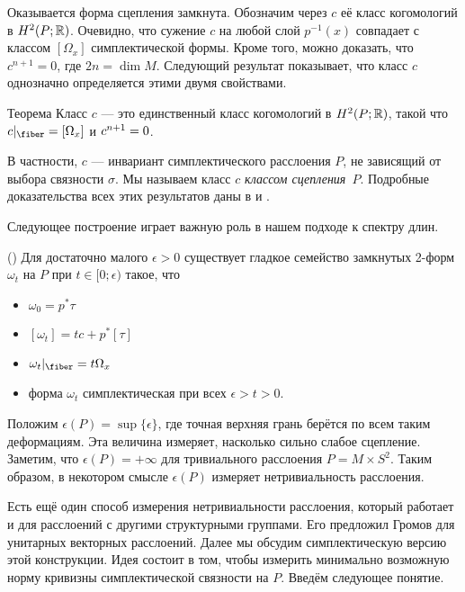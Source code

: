 Оказывается форма сцепления замкнута.
Обозначим через $c$ её класс когомологий в $H^2 (P;\mathbb{R})$.
Очевидно, что сужение $c$ на любой слой $p^{-1}(x)$ совпадает с классом $[\Omega_x]$
симплектической формы.  
Кроме того, можно доказать, что $c^{n+1} = 0$, где $2n = \dim M$.
Следующий результат показывает, что класс $c$ однозначно определяется
этими двумя свойствами. 

\begin{thm}{Теорема}\label{9.3.A}
  Класс $c$ — это единственный класс когомологий в $H^2 (P;\mathbb{R})$,
  такой что $c|_{\fiber} = [\Omega_x]$ и $c^{n+1} \z= 0$.
\end{thm}

В частности, $c$ — инвариант симплектического расслоения $P$, не
зависящий от выбора связности $\sigma$. 
Мы называем класс $c$ \emph{классом сцепления}~$P$.
Подробные доказательства всех этих результатов даны в \cite{GLS} и \cite{MS}.

Следующее построение играет важную роль в нашем подходе к спектру длин.

(\cite{GLS,MS})
Для достаточно малого $\epsilon > 0$ существует гладкое семейство
замкнутых 2-форм $\omega_t$ на $P$ при $t \in [0;\epsilon)$ такое, что 
\begin{itemize}
\item $\omega_0 = p^\ast \tau$
\item $[\omega_t] = tc + p^\ast [\tau]$
\item $\omega_t|_{\fiber} = t\Omega_x$
\item форма $\omega_t$ симплектическая при всех $\epsilon > t > 0$.
\end{itemize}

Положим $\epsilon(P) = \sup \{\epsilon\}$,
где точная верхняя грань берётся по всем таким деформациям.  
Эта величина измеряет, насколько сильно слабое сцепление.
Заметим, что $\epsilon(P) = +\infty$ для тривиального расслоения $P = M \times S^2$.
Таким образом, в некотором смысле $\epsilon(P)$ измеряет нетривиальность расслоения.

Есть ещё один способ измерения нетривиальности расслоения, который
работает и для расслоений с другими структурными группами. 
Его предложил Громов \cite{G2} для унитарных векторных расслоений.
Далее мы обсудим симплектическую версию этой конструкции. 
Идея состоит в том, чтобы измерить минимально возможную норму кривизны
симплектической связности на $P$. 
Введём следующее понятие.

